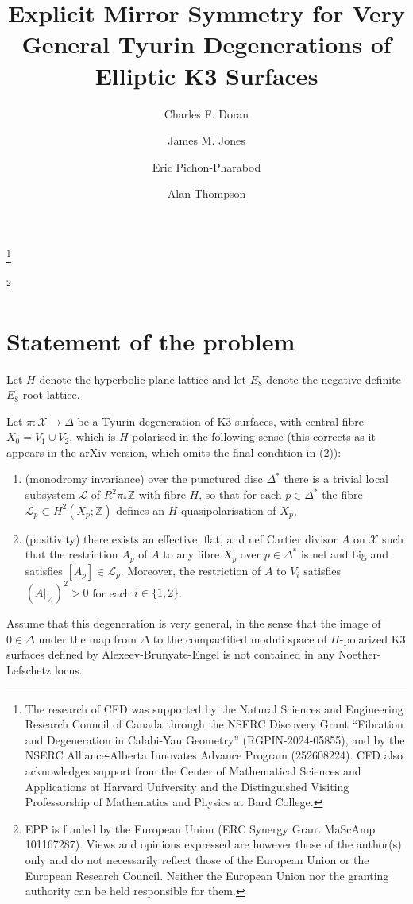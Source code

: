 \documentclass[a4paper]{amsart}
\theoremstyle{definition}
\theoremstyle{plain}
\theoremstyle{remark}
\newcommand{\bZ}{\mathbb{Z}}
\newcommand{\calL}{\mathcal{L}}
\newcommand{\calX}{\mathcal{X}}
\numberwithin{figure}{section}
\numberwithin{table}{section}
\begin{document}
\title[Explicit Mirror Symmetry for Tyurin Degenerations of Elliptic K3's]{Explicit Mirror Symmetry for Very General Tyurin Degenerations of Elliptic K3 Surfaces}

\author[C. F. Doran]{Charles F. Doran}
\thanks{The research of CFD was supported by the Natural Sciences and Engineering Research Council of Canada through the NSERC Discovery Grant ``Fibration and Degeneration in Calabi-Yau Geometry'' (RGPIN-2024-05855), and by the NSERC Alliance-Alberta Innovates Advance Program (252608224). CFD also acknowledges support from the Center of Mathematical Sciences and Applications at Harvard University and the Distinguished Visiting Professorship of Mathematics and Physics at Bard College.}

\author[J. M. Jones]{James M. Jones}

\author[E. Pichon-Pharabod]{Eric Pichon-Pharabod}
\thanks{EPP is funded by the European Union (ERC Synergy Grant MaScAmp 101167287). Views and opinions expressed are however those of the author(s) only and do not necessarily reflect those of the European Union or the European Research Council. Neither the European Union nor the granting authority can be held responsible for them.}

\author[A. Thompson]{Alan Thompson}

\date{}
\maketitle

\section{Statement of the problem}\label{sec:problem}

Let $H$ denote the hyperbolic plane lattice and let $E_8$ denote the negative definite $E_8$ root lattice.

Let $\pi \colon \mathcal{X} \to \Delta$ be a Tyurin degeneration of K3 surfaces, with central fibre $X_0 = V_1 \cup V_2$, which is $H$-polarised in the following sense (this corrects \cite[Definition 3.20]{dfk3slpms} as it appears in the arXiv version, which omits the final condition in (2)):
\begin{enumerate}
\item (monodromy invariance) over the punctured disc $\Delta^*$ there is a trivial local subsystem $\calL$ of $R^2\pi_*\bZ$ with fibre $H$, so that for each $p \in \Delta^*$ the fibre $\calL_p \subset H^2(X_p;\bZ)$ defines an $H$-quasi\-polarisation of $X_p$,
\item (positivity) there exists an effective, flat, and nef Cartier divisor $A$ on $\calX$ such that the restriction $A_p$ of $A$ to any fibre $X_p$ over $p \in \Delta^*$ is nef and big and satisfies $[A_p] \in \calL_p$. Moreover, the restriction of $A$ to $V_i$ satisfies $(A|_{V_i})^2 > 0$ for each $i \in \{1,2\}$.
\end{enumerate}
Assume that this degeneration is very general, in the sense that the image of $0 \in \Delta$ under the map from $\Delta$ to the compactified moduli space of $H$-polarized K3 surfaces defined by Alexeev-Brunyate-Engel \cite{cmek3sspt} is not contained in any Noether-Lefschetz locus. 
\end{document}
